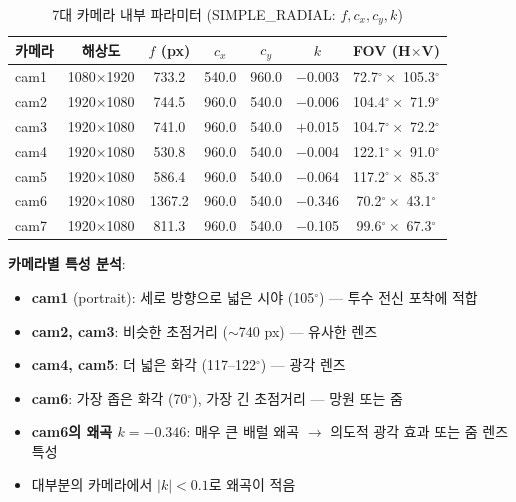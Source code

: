 \documentclass[11pt, a4paper]{report}
\begin{document}
\begin{table}[H]
\centering
\caption{7대 카메라 내부 파라미터 (SIMPLE\_RADIAL: $f, c_x, c_y, k$)}
\label{tab:r2_cameras}
\renewcommand{\arraystretch}{1.3}
\small
\begin{tabular}{lcccccc}
\toprule
\textbf{카메라} & \textbf{해상도} & \textbf{$f$ (px)} & \textbf{$c_x$} & \textbf{$c_y$} & \textbf{$k$} & \textbf{FOV (H$\times$V)} \\
\midrule
cam1 & 1080$\times$1920 & 733.2 & 540.0 & 960.0 & $-$0.003 & 72.7$^\circ \times$ 105.3$^\circ$ \\
cam2 & 1920$\times$1080 & 744.5 & 960.0 & 540.0 & $-$0.006 & 104.4$^\circ \times$ 71.9$^\circ$ \\
cam3 & 1920$\times$1080 & 741.0 & 960.0 & 540.0 & $+$0.015 & 104.7$^\circ \times$ 72.2$^\circ$ \\
cam4 & 1920$\times$1080 & 530.8 & 960.0 & 540.0 & $-$0.004 & 122.1$^\circ \times$ 91.0$^\circ$ \\
cam5 & 1920$\times$1080 & 586.4 & 960.0 & 540.0 & $-$0.064 & 117.2$^\circ \times$ 85.3$^\circ$ \\
cam6 & 1920$\times$1080 & 1367.2 & 960.0 & 540.0 & $-$0.346 & 70.2$^\circ \times$ 43.1$^\circ$ \\
cam7 & 1920$\times$1080 & 811.3 & 960.0 & 540.0 & $-$0.105 & 99.6$^\circ \times$ 67.3$^\circ$ \\
\bottomrule
\end{tabular}
\end{table}

\begin{keyidea}
\textbf{카메라별 특성 분석}:
\begin{itemize}[nosep]
  \item \textbf{cam1} (portrait): 세로 방향으로 넓은 시야 (105$^\circ$) --- 투수 전신 포착에 적합
  \item \textbf{cam2, cam3}: 비슷한 초점거리 ($\sim$740 px) --- 유사한 렌즈
  \item \textbf{cam4, cam5}: 더 넓은 화각 (117--122$^\circ$) --- 광각 렌즈
  \item \textbf{cam6}: 가장 좁은 화각 (70$^\circ$), 가장 긴 초점거리 --- 망원 또는 줌
  \item \textbf{cam6의 왜곡 $k=-0.346$}: 매우 큰 배럴 왜곡 $\rightarrow$ 의도적 광각 효과 또는 줌 렌즈 특성
  \item 대부분의 카메라에서 $|k| < 0.1$로 왜곡이 적음
\end{itemize}
\end{keyidea}
\end{document}

